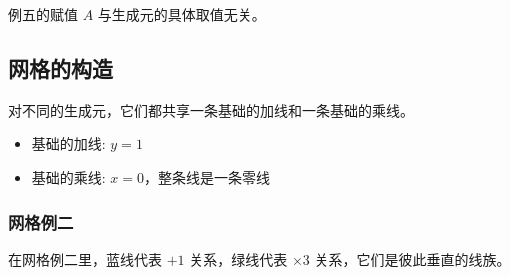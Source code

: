 \documentclass[a4paper,12pt]{article}
\numberwithin{definition}{section}
\numberwithin{lemma}{section}
\numberwithin{proposition}{section}
\numberwithin{theorem}{section}
\numberwithin{grammar}{section}
\numberwithin{program}{section}
\numberwithin{convention}{section}
\numberwithin{corollary}{section}
\begin{document}
例五的赋值 $A$ 与生成元的具体取值无关。

\subsection{网格的构造}

对不同的生成元，它们都共享一条基础的加线和一条基础的乘线。
\begin{itemize}
    \item 基础的加线: $y = 1$
    \item 基础的乘线: $x = 0$，整条线是一条零线
\end{itemize}

\subsubsection{网格例二}

在网格例二里，蓝线代表 $+ 1$ 关系，绿线代表 $\times 3$ 关系，它们是彼此垂直的线族。
\end{document}
